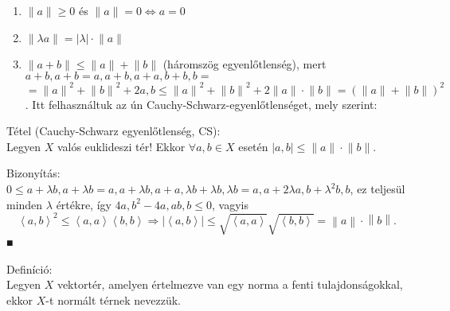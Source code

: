 \documentclass[]{scrartcl}
\providecommand{\tightlist}{%
  \setlength{\itemsep}{0pt}\setlength{\parskip}{0pt}}
\newenvironment{definicio}{}{}
\newenvironment{tetel}{}{}
\newenvironment{bizonyitas}{}{}
\begin{document}
\begin{enumerate}
\def\labelenumi{\arabic{enumi}.}
\tightlist
\item
  \(\left\| a \parallel \right. \geq 0\) és
  \(\left. \left\| a \parallel \right. = 0\Leftrightarrow a = 0 \right.\)
\item
  \(\left\| {\lambda a} \parallel \right. = \left| \lambda \right| \cdot \left\| a \parallel \right.\)
\item
  \(\left\| {a + b} \parallel \right. \leq \left\| a \parallel \right. + \left\| b \parallel \right.\)
  (háromszög egyenlőtlenség), mert
  \({a + b,a + b} = {a,a} + {b,a} + {a,b} + {b,b} =\)
  \(= \left\| a \parallel \right.^{2} + \left\| b \parallel \right.^{2} + 2{a,b} \leq \left\| a \parallel \right.^{2} + \left\| b \parallel \right.^{2} + 2\left\| a \parallel \right. \cdot \left\| b \parallel \right. = \left( {\left\| a \parallel \right. + \left\| b \parallel \right.} \right)^{2}\).
  Itt felhasználtuk az ún Cauchy-Schwarz-egyenlőtlenséget, mely szerint:
\end{enumerate}

\hypertarget{cauchy-schwarz}{}
\begin{tetel}

Tétel (Cauchy-Schwarz egyenlőtlenség, CS):\\
Legyen \(X\) valós euklideszi tér! Ekkor \(\forall a,b \in X\) esetén
\(\left| {a,b} \right| \leq \left\| a \parallel \right. \cdot \left\| b \parallel \right.\).

\end{tetel}

\begin{bizonyitas}

Bizonyítás:\\
\(0 \leq {a + \lambda b,a + \lambda b} = {a,a} + {\lambda b,a} + {a,\lambda b} + {\lambda b,\lambda b} = {a,a} + 2\lambda{a,b} + \lambda^{2}{b,b}\),
ez teljesül minden \(\lambda\) értékre, így
\(4{a,b}^{2} - 4{a,a}{b,b} \leq 0\), vagyis
\[\left. \left\langle {a,b} \right\rangle^{2} \leq \left\langle {a,a} \right\rangle\left\langle {b,b} \right\rangle\Rightarrow\left| \left\langle {a,b} \right\rangle \right| \leq \sqrt{\left\langle {a,a} \right\rangle}\sqrt{\left\langle {b,b} \right\rangle} = \left\| a \right\| \cdot \left\| b \right\|. \right.\]
■

\end{bizonyitas}

\begin{definicio}

Definíció:\\
Legyen \(X\) vektortér, amelyen értelmezve van egy norma a fenti
tulajdonságokkal, ekkor \(X\)-t normált térnek nevezzük.

\end{definicio}
\end{document}
